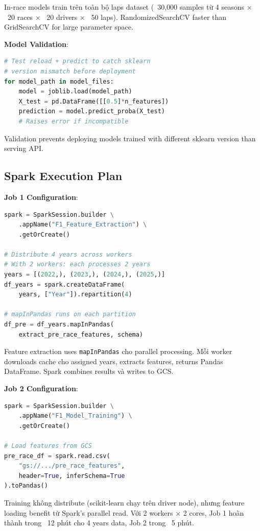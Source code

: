 \documentclass[conference,10pt]{IEEEtran}
\begin{document}
In-race models train trên toàn bộ laps dataset (~30,000 samples từ 4 seasons × ~20 races × ~20 drivers × ~50 laps). RandomizedSearchCV faster than GridSearchCV for large parameter space.

\textbf{Model Validation}:
\begin{lstlisting}[language=Python]
# Test reload + predict to catch sklearn
# version mismatch before deployment
for model_path in model_files:
    model = joblib.load(model_path)
    X_test = pd.DataFrame([[0.5]*n_features])
    prediction = model.predict_proba(X_test)
    # Raises error if incompatible
\end{lstlisting}

Validation prevents deploying models trained with different sklearn version than serving API.

\subsection{Spark Execution Plan}

\textbf{Job 1 Configuration}:
\begin{lstlisting}[language=Python]
spark = SparkSession.builder \
    .appName("F1_Feature_Extraction") \
    .getOrCreate()

# Distribute 4 years across workers
# With 2 workers: each processes 2 years
years = [(2022,), (2023,), (2024,), (2025,)]
df_years = spark.createDataFrame(
    years, ["Year"]).repartition(4)

# mapInPandas runs on each partition
df_pre = df_years.mapInPandas(
    extract_pre_race_features, schema)
\end{lstlisting}

Feature extraction uses \texttt{mapInPandas} cho parallel processing. Mỗi worker downloads cache cho assigned years, extracts features, returns Pandas DataFrame. Spark combines results và writes to GCS.

\textbf{Job 2 Configuration}:
\begin{lstlisting}[language=Python]
spark = SparkSession.builder \
    .appName("F1_Model_Training") \
    .getOrCreate()

# Load features from GCS
pre_race_df = spark.read.csv(
    "gs://.../pre_race_features",
    header=True, inferSchema=True
).toPandas()
\end{lstlisting}

Training không distribute (scikit-learn chạy trên driver node), nhưng feature loading benefit từ Spark's parallel read. Với 2 workers × 2 cores, Job 1 hoàn thành trong ~12 phút cho 4 years data, Job 2 trong ~5 phút.
\end{document}
